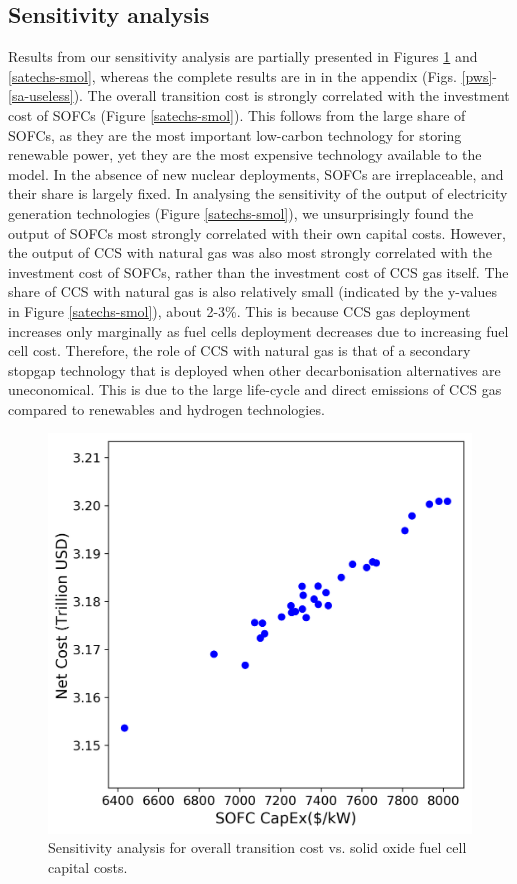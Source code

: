 \subsection{Sensitivity analysis}

Results from our sensitivity analysis are partially presented in Figures \ref{syscost-smol} and \ref{satechs-smol}, whereas the complete results are in in the appendix (Figs. \ref{pws}-\ref{sa-useless}). The overall transition cost is strongly correlated with the investment cost of \gls{SOFC}s (Figure \ref{satechs-smol}). This follows from the large share of \gls{SOFC}s, as they are the most important low-carbon technology for storing renewable power, yet they are the most expensive technology available to the model. In the absence of new nuclear deployments, \glspl{SOFC} are irreplaceable, and their share is largely fixed. In analysing the sensitivity of the output of electricity generation technologies (Figure \ref{satechs-smol}), we unsurprisingly found the output of \gls{SOFC}s most strongly correlated with their own capital costs. However, the output of \gls{CCS} with natural gas was also most strongly correlated with the investment cost of \gls{SOFC}s, rather than the investment cost of CCS gas itself. The share of \gls{CCS} with natural gas is also relatively small (indicated by the y-values in Figure \ref{satechs-smol}), about 2-3\%.  This is because CCS gas deployment increases only marginally as fuel cells deployment decreases due to increasing fuel cell cost. Therefore, the role of CCS with natural gas is that of a secondary stopgap technology that is deployed when other decarbonisation alternatives are uneconomical. This is due to the large life-cycle and direct emissions of CCS gas compared to renewables and hydrogen technologies.

\begin{figure}[b!] 
\centering
\hspace*{-1cm}
\includegraphics[scale=0.7]{figures/syscost_abbrv}
\caption{Sensitivity analysis for overall transition cost vs. solid oxide fuel cell capital costs.}
\label{syscost-smol}
\end{figure}

